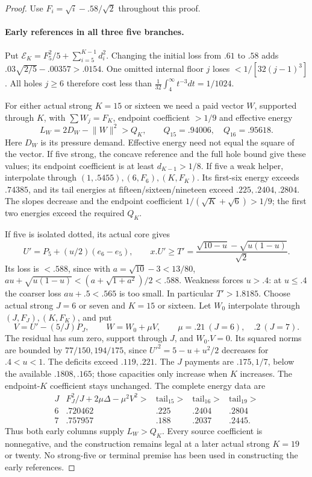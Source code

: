 \documentclass[11pt]{article}
\theoremstyle{definition}
\theoremstyle{remark}
\newcommand{\norm}[1]{\lVert #1\rVert}
\begin{document}
\begin{proof}
Use $F_i=\sqrt i-.58/\sqrt2$ throughout this proof.

\paragraph{Early references in all three five branches.}
Put $\mathcal E_K=F_5^2/5+\sum_{i=5}^{K-1}d_i^2$.
Changing the initial loss from $.61$ to $.58$ adds
$ .03\sqrt{2/5}-.00357>.0154$.
One omitted internal floor $j$ loses $<1/[32(j-1)^3]$.
All holes $j\ge6$ therefore cost less than
$\frac1{32}\int_4^\infty t^{-3}dt=1/1024$.

For either actual strong $K=15$ or sixteen we need a paid vector
$W$, supported through $K$, with $\sum W_j=F_K$, endpoint
coefficient $>1/9$ and effective energy
\[
 L_W=2D_W-\norm W^2>Q_K,\qquad Q_{15}=.94006,\quad Q_{16}=.95618.
\]
Here $D_W$ is its pressure demand. Effective energy need not equal
the square of the vector.
If five strong, the concave reference and the full hole bound give
these values; its endpoint coefficient is at least $d_{K-1}>1/8$.
If five a weak helper, interpolate through $(1,.5455),(6,F_6),(K,F_K)$.
Its first-six energy exceeds $.74385$, and its tail energies at
fifteen/sixteen/nineteen exceed $.225,.2404,.2804$.
The slopes decrease and the endpoint coefficient
$1/(\sqrt K+\sqrt6)>1/9$; the first two energies exceed the required
$Q_K$.

If five is isolated dotted, its actual core gives
\[
 U'=P_5+(u/2)(e_6-e_5),\qquad
 x.U'\ge T'={\frac{\sqrt{10-u}-\sqrt{u(1-u)}}{\sqrt2}}.
\]
Its loss is $<.588$, since with $a=\sqrt{10}-3<13/80$,
$au+\sqrt{u(1-u)}<(a+\sqrt{1+a^2})/2<.588$.
Weakness forces $u>.4$: at $u\le.4$ the coarser loss
$au+.5<.565$ is too small. In particular $T'>1.8185$.
Choose actual strong $J=6$ or seven and $K=15$ or sixteen.
Let $W_0$ interpolate through $(J,F_J),(K,F_K)$, and put
\[
 V=U'-(5/J)P_J,\qquad W=W_0+\mu V,
 \qquad \mu=.21\ (J=6),\quad .2\ (J=7).
\]
The residual has sum zero, support through $J$, and $W_0.V=0$.
Its squared norms are bounded by $77/150,194/175$, since
$U'^2=5-u+u^2/2$ decreases for $.4<u<1$.
The deficits exceed $.119,.221$. The $J$ payments are $.175,1/7$,
below the available $.1808,.165$; those capacities only increase
when $K$ increases. The endpoint-$K$ coefficient stays unchanged.
The complete energy data are
\[
\begin{array}{c|c|c|c|c}
J&F_J^2/J+2\mu\Delta-\mu^2V^2>&\text{tail}_{15}>&
 \text{tail}_{16}>&\text{tail}_{19}>\\\hline
6&.720462&.225&.2404&.2804\\7&.757957&.188&.2037&.2445 .
\end{array}
\]
Thus both early columns supply $L_W>Q_K$. Every source coefficient
is nonnegative, and the construction remains legal at a later actual
strong $K=19$ or twenty. No strong-five or terminal premise has been
used in constructing the early references.


\end{proof}
\end{document}
